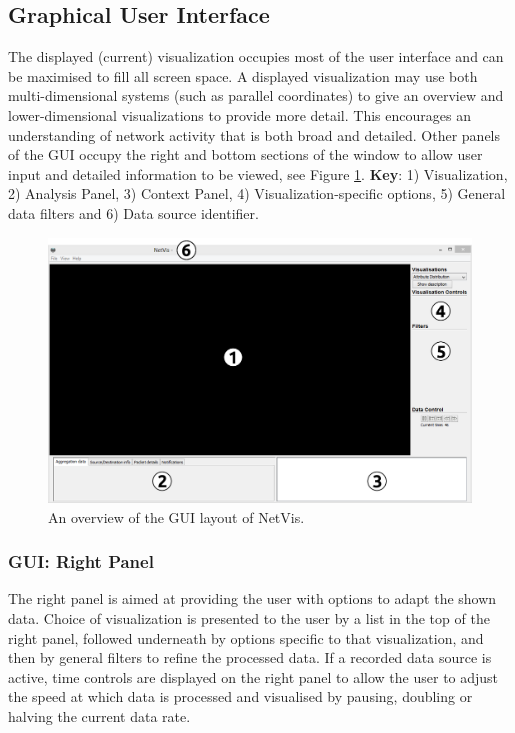 \subsection{Graphical User Interface}
The displayed (current) visualization occupies most of the user interface and can be maximised to
fill all screen space. A displayed visualization may use both multi-dimensional systems (such as
parallel coordinates) to give an overview and lower-dimensional visualizations to provide more
detail. This encourages an understanding of network activity that is both broad and detailed. Other
panels of the GUI occupy the right and bottom sections of the window to allow user input and
detailed information to be viewed, see Figure \ref{fig:layout}. {\textbf{Key}}: 1) Visualization, 2)
Analysis Panel, 3) Context Panel, 4) Visualization-specific options, 5) General data filters and 6)
Data source identifier.

\begin{figure}[htb]
   \centering
   \includegraphics[width=\linewidth]{materials/layout-diagram.png}
   \caption[GUI]{\label{fig:layout}
         An overview of the GUI layout of NetVis.}
\end{figure}

\subsubsection{GUI: Right Panel}
The right panel is aimed at providing the user with options to adapt the shown data. Choice of
visualization is presented to the user by a list in the top of the right panel, followed underneath
by options specific to that visualization, and then by general filters to refine the processed data.
If a recorded data source is active, time controls are displayed on the right panel to allow the
user to adjust the speed at which data is processed and visualised by pausing, doubling or halving
the current data rate.

